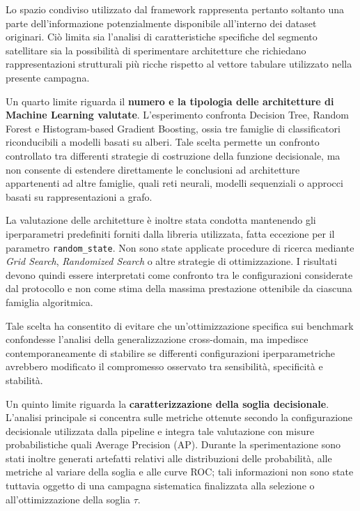 Lo spazio condiviso utilizzato dal framework rappresenta pertanto soltanto una parte dell'informazione potenzialmente disponibile all'interno dei dataset originari.
Ciò limita sia l'analisi di caratteristiche specifiche del segmento satellitare sia la possibilità di sperimentare architetture che richiedano rappresentazioni strutturali più ricche rispetto al vettore tabulare utilizzato nella presente campagna.

Un quarto limite riguarda il \textbf{numero e la tipologia delle architetture di Machine Learning valutate}.
L'esperimento confronta Decision Tree, Random Forest e Histogram-based Gradient Boosting, ossia tre famiglie di classificatori riconducibili a modelli basati su alberi.
Tale scelta permette un confronto controllato tra differenti strategie di costruzione della funzione decisionale, ma non consente di estendere direttamente le conclusioni ad architetture appartenenti ad altre famiglie, quali reti neurali, modelli sequenziali o approcci basati su rappresentazioni a grafo.

La valutazione delle architetture è inoltre stata condotta mantenendo gli iperparametri predefiniti forniti dalla libreria utilizzata, fatta eccezione per il parametro \texttt{random\_state}.
Non sono state applicate procedure di ricerca mediante \textit{Grid Search}, \textit{Randomized Search} o altre strategie di ottimizzazione.
I risultati devono quindi essere interpretati come confronto tra le configurazioni considerate dal protocollo e non come stima della massima prestazione ottenibile da ciascuna famiglia algoritmica.

Tale scelta ha consentito di evitare che un'ottimizzazione specifica sui benchmark confondesse l'analisi della generalizzazione cross-domain, ma impedisce contemporaneamente di stabilire se differenti configurazioni iperparametriche avrebbero modificato il compromesso osservato tra sensibilità, specificità e stabilità.

Un quinto limite riguarda la \textbf{caratterizzazione della soglia decisionale}.
L'analisi principale si concentra sulle metriche ottenute secondo la configurazione decisionale utilizzata dalla pipeline e integra tale valutazione con misure probabilistiche quali Average Precision (AP).
Durante la sperimentazione sono stati inoltre generati artefatti relativi alle distribuzioni delle probabilità, alle metriche al variare della soglia e alle curve ROC; tali informazioni non sono state tuttavia oggetto di una campagna sistematica finalizzata alla selezione o all'ottimizzazione della soglia $\tau$.

